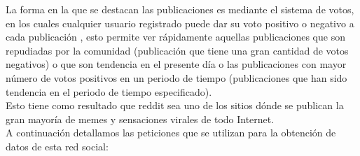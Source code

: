 \documentclass[../../main.tex]{subfiles}
\begin{document}
La forma en la que se destacan las publicaciones es mediante el sistema de votos, en los cuales cualquier usuario registrado puede dar su voto positivo o negativo a cada publicación , esto permite ver rápidamente aquellas publicaciones que son repudiadas por la comunidad (publicación que tiene una gran cantidad de votos negativos) o que son tendencia en el presente día o las publicaciones con mayor número de votos positivos en un periodo de tiempo (publicaciones que han sido tendencia en el periodo de tiempo especificado).  \\

Esto tiene como resultado que \Gls{reddit} sea uno de los sitios dónde se publican la gran mayoría de memes y sensaciones virales de todo Internet.\\

A continuación detallamos las peticiones que se utilizan para la obtención de datos de esta red social:
\end{document}
